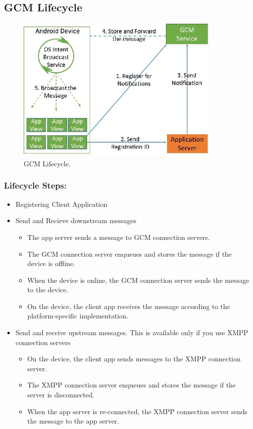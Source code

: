 \subsection{GCM Lifecycle}
\begin{figure}[h]
\centering
\includegraphics[width=10cm]{images/Steps.jpg}
\caption{\label{fig:arch}GCM Lifecycle.}
\end{figure} 
\subsubsection{Lifecycle Steps: }
\begin{itemize}
	\item Registering Client Application
	\item Send and Recieve downstream messages
		\begin{itemize}
			\item The app server sends a message to GCM connection servers.
			\item The GCM connection server enqueues and stores the message if the device is offline.
			\item When the device is online, the GCM connection server sends the message to the device.
			\item On the device, the client app receives the message according to the platform-specific implementation.
		\end{itemize}
	\item Send and receive upstream messages. This is available only if you use XMPP connection servers
		\begin{itemize}
			\item On the device, the client app sends messages to the XMPP connection server.
			\item The XMPP connection server enqueues and stores the message if the server is disconnected.
			\item When the app server is re-connected, the XMPP connection server sends the message to the app server.
		\end{itemize}
\end{itemize}
